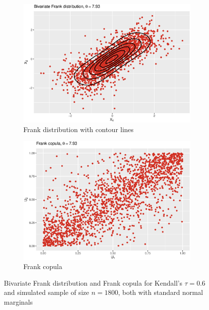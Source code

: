  \begin{figure}[H]
\centering
\begin{subfigure}{.45\textwidth}
  \centering
  \includegraphics[width=\linewidth]{figures/bivariate_frank.eps}
  \caption{Frank distribution with contour lines}
  \label{fig:bivariate_frank}
\end{subfigure}
\begin{subfigure}{.45\textwidth}
  \centering
  \includegraphics[width=\linewidth]{figures/frank_copula.eps}
  \caption{Frank copula}
  \label{fig:frank_copula}
\end{subfigure}
\caption{Bivariate Frank distribution and Frank copula for Kendall's $\tau = 0.6$ and simulated sample of size $n = 1800$, both with standard normal marginals}
\label{fig:frank_plots}
\end{figure}





